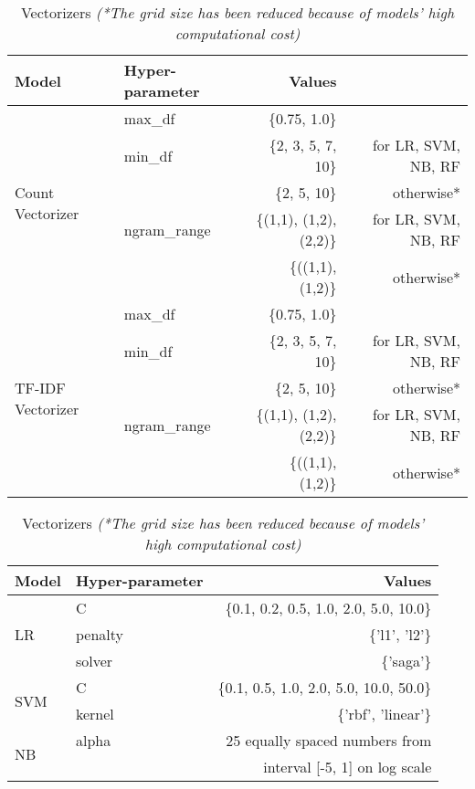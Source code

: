 \begin{table}[htbp]
\begin{subtable}{\textwidth}
\centering
\begin{tabular}{llrr}
\hline
\textbf{Model} & \textbf{Hyper-parameter} & \textbf{Values} \\
\hline
\multirow{5}{*}{Count Vectorizer} & max\_df & \{0.75, 1.0\} &  \\
 & min\_df & \{2, 3, 5, 7, 10\} & for \ac{LR}, \ac{SVM}, \ac{NB}, \ac{RF} \\
 &  & \{2, 5, 10\} & otherwise* \\
 & ngram\_range & \{(1,1), (1,2), (2,2)\} & for \ac{LR}, \ac{SVM}, \ac{NB}, \ac{RF} \\
 &  & \{((1,1), (1,2)\} & otherwise* \\ \hline
\multirow{5}{*}{TF-IDF Vectorizer} & max\_df & \{0.75, 1.0\} &  \\
 & min\_df & \{2, 3, 5, 7, 10\} & for \ac{LR}, \ac{SVM}, \ac{NB}, \ac{RF} \\
 &  & \{2, 5, 10\} & otherwise* \\
 & ngram\_range & \{(1,1), (1,2), (2,2)\} & for \ac{LR}, \ac{SVM}, \ac{NB}, \ac{RF} \\
 &  & \{((1,1), (1,2)\} & otherwise* \\ \hline
\end{tabular}
\caption{Vectorizers \emph{(*The grid size has been reduced because of models' high computational cost)} }
\vspace{1cm}
\end{subtable}
\begin{subtable}{\textwidth}
\centering
\begin{tabular}{llr}
\hline
\textbf{Model} & \textbf{Hyper-parameter} & \textbf{Values} \\
\hline
\multirow{3}{*}{LR} & C & \{0.1, 0.2, 0.5, 1.0, 2.0, 5.0, 10.0\} \\
 & penalty & \{'l1', 'l2'\} \\
 & solver & \{'saga'\} \\
\hline
\multirow{2}{*}{SVM} & C & \{0.1, 0.5, 1.0, 2.0, 5.0, 10.0, 50.0\} \\
 & kernel & \{'rbf', 'linear'\} \\
\hline
\multirow{2}{*}{NB} & alpha & 25 equally spaced numbers from \\ & & interval {[}-5, 1{]} on log scale \\
\hline

\end{tabular}
\end{subtable}
\end{table}
